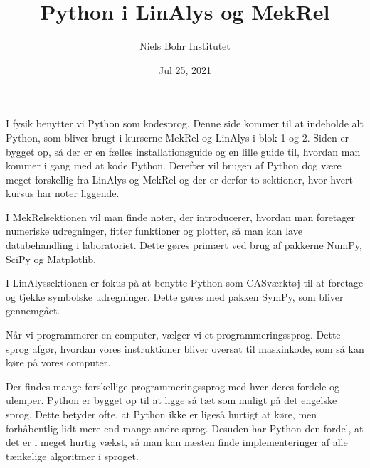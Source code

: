 \documentclass[letterpaper,10pt,english]{jupyterBook}
\title{Python i LinAlys og MekRel}
\date{Jul 25, 2021}
\author{Niels Bohr Institutet}
\begin{document}
\pagestyle{empty}
\sphinxmaketitle
\pagestyle{plain}
\sphinxtableofcontents
\pagestyle{normal}
\label{\detokenize{intro::doc}}





I fysik benytter vi Python som kodesprog. Denne side kommer til at indeholde alt Python, som bliver brugt i kurserne MekRel og LinAlys i blok 1 og 2. Siden er bygget op, så der er en fælles installationsguide og en lille guide til, hvordan man kommer i gang med at kode Python. Derefter vil brugen af Python dog være meget forskellig fra LinAlys og MekRel og der er derfor to sektioner, hvor hvert kursus har noter liggende.

I MekRel\sphinxhyphen{}sektionen vil man finde noter, der introducerer, hvordan man foretager numeriske udregninger, fitter funktioner og plotter, så man kan lave databehandling i laboratoriet. Dette gøres primært ved brug af pakkerne NumPy, SciPy og Matplotlib.

I LinAlys\sphinxhyphen{}sektionen er fokus på at benytte Python som CAS\sphinxhyphen{}værktøj til at foretage og tjekke symbolske udregninger. Dette gøres med pakken SymPy, som bliver gennemgået.

\begin{DUlineblock}{0em}
\item[] 
\end{DUlineblock}

Når vi programmerer en computer, vælger vi et programmeringssprog. Dette sprog afgør, hvordan vores instruktioner bliver oversat til maskinkode, som så kan køre på vores computer.

Der findes mange forskellige programmeringssprog med hver deres fordele og ulemper. Python er bygget op til at ligge så tæt som muligt på det engelske sprog.  Dette betyder ofte, at Python ikke er ligeså hurtigt at køre, men forhåbentlig lidt mere  end mange andre sprog. Desuden har Python den fordel, at det er i meget hurtig vækst, så man kan næsten finde implementeringer af alle tænkelige algoritmer i sproget.

\begin{DUlineblock}{0em}
\item[] 
\end{DUlineblock}
\end{document}
